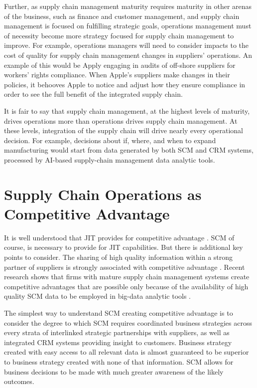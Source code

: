 \documentclass[man]{apa7}
\begin{document}
Further, as supply chain management maturity requires maturity in other arenas of the business, such as finance and customer management, and supply chain management is focused on fulfilling strategic goals, operations management must of necessity become more strategy focused for supply chain management to improve. For example, operations managers will need to consider impacts to the cost of quality for supply chain management changes in suppliers' operations. An example of this would be Apply engaging in audits of off-shore suppliers for workers' rights compliance. When Apple's suppliers make changes in their policies, it behooves Apple to notice and adjust how they ensure compliance in order to see the full benefit of the integrated supply chain.

It is fair to say that supply chain management, at the highest levels of maturity, drives operations more than operations drives supply chain management. At these levels, integration of the supply chain will drive nearly every operational decision. For example, decisions about if, where, and when to expand manufacturing would start from data generated by both SCM and CRM systems, processed by AI-based supply-chain management data analytic tools.

\section{Supply Chain Operations as Competitive Advantage}
\label{sec:orgb00ed0c}

It is well understood that JIT provides for competitive advantage \parencite{yangAchievingJustTime2021}. SCM of course, is necessary to provide for JIT capabilities. But there is additional key points to consider. The sharing of high quality information within a strong partner of suppliers is strongly associated with competitive advantage \parencite{keawkuntiRelationshipSupplyChain2020}. Recent research shows that firms with mature supply chain management systems create competitive advantages that are possible only because of the availability of high quality SCM data to be employed in big-data analytic tools \parencite{herdenExplainingCompetitiveAdvantage2020}.

The simplest way to understand SCM creating competitive advantage is to consider the degree to which SCM requires coordinated business strategies across every strata of interlinked strategic partnerships with suppliers, as well as integrated CRM systems providing insight to customers. Business strategy created with easy access to all relevant data is almost guaranteed to be superior to business strategy created with none of that information. SCM allows for business decisions to be made with much greater awareness of the likely outcomes.
\end{document}
